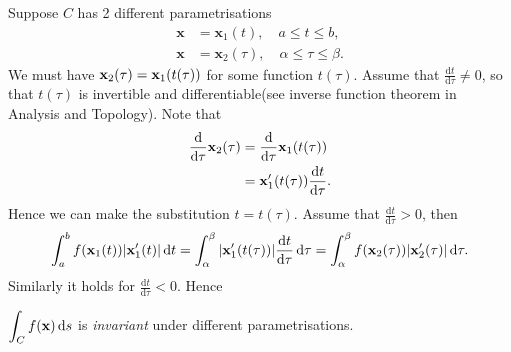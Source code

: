Suppose $C$ has 2 different parametrisations
\begin{align*}
    \mathbf{x} &= \mathbf{x}_1(t), \quad a\le t\le b,\\
    \mathbf{x} &= \mathbf{x}_2(\tau),\quad \alpha\le \tau\le \beta.
\end{align*}
We must have $ {\bf x}_2(\tau) = {\bf x}_1(t(\tau)) $ for some function $t(\tau)$. Assume that $ \frac{\mathrm{d}t}{\mathrm{d}\tau}\neq 0  $, so that $ t(\tau) $ is invertible and differentiable(see inverse function theorem in Analysis and Topology). Note that 
\begin{align*}
    \frac{\mathrm{d}}{\mathrm{d}\tau} \mathbf{x}_2(\tau) &= \frac{\mathrm{d}}{\mathrm{d}\tau} \mathbf{x}_1(t(\tau))\\
    &= {\bf x}_1'(t(\tau)) \frac{\mathrm{d}t}{\mathrm{d}\tau}.  
\end{align*}
Hence we can make the substitution $ t=t(\tau) $. Assume that $ \frac{\mathrm{d}t}{\mathrm{d}\tau}>0  $, then 
\[
    \int_{a}^{b} f({\bf x}_1(t)) |\mathbf{x}_1'(t)| \,\mathrm{d}t = \int_{\alpha}^{\beta} |\mathbf{x}_1'(t(\tau))| \frac{\mathrm{d}t}{\mathrm{d}\tau}  \,\mathrm{d}\tau = \int_{\alpha}^{\beta} f({\bf x}_2(\tau))|\mathbf{x}_2'(\tau)| \,\mathrm{d}\tau.
\]
Similarly it holds for $ \frac{\mathrm{d}t}{\mathrm{d}\tau}<0  $. Hence
\begin{proposition}\label{prop:change of parametrisations}
    $ \displaystyle \int_{C} f({\bf x}) \,\mathrm{d}s $ is \textit{invariant} under different parametrisations.
\end{proposition}
